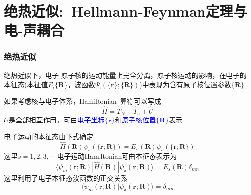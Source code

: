 \section{绝热近似:~\rm{Hellmann-Feynman}定理与电-声耦合}
\frame
{
	\frametitle{绝热近似}
	绝热近似下，电子-原子核的运动能量上完全分离，原子核运动的影响，在电子的本征态(本征值$E_i\{\mathbf{R}\}$，波函数$\Psi_i(\{\mathbf{r}\};\{\mathbf{R}\})$)中表现为含有原子核位置参数$\{\mathbf{R}\}$

	如果考虑核与电子体系，\textrm{Hamiltonian~}算符可以写成
	\begin{displaymath}
		\hat H=\hat T_N+\hat T_e+\hat U
	\end{displaymath}
	$U$是全部相互作用，可由\textcolor{blue}{电子坐标$\{\mathbf{r}\}$}和\textcolor{blue}{原子核位置$\{\mathbf{R}\}$}表示

	电子运动的本征态由下式确定
	\begin{displaymath}
		\hat H(\mathbf{R})\psi_s(\{\mathbf{r};\mathbf{R}\})=E_s(\mathbf{R})\psi_s(\{\mathbf{r};\mathbf{R}\})
	\end{displaymath}
	这里$s=1,2,3,\cdots$
	电子运动\textrm{Hamiltonian}可由本征态表示为
	\begin{displaymath}
		\langle\psi_m(\mathbf{r};\mathbf{R})|\hat H(\mathbf{R})|\psi_n(\mathbf{r};\mathbf{R})\rangle=E_s(\mathbf{R})\delta_{mn}
	\end{displaymath}
	这里利用了电子本征态波函数的正交关系
	\begin{displaymath}
		\langle\psi_m(\mathbf{r};\mathbf{R})|\psi_n(\mathbf{r};\mathbf{R})\rangle=\delta_{mn}
	\end{displaymath}
}

